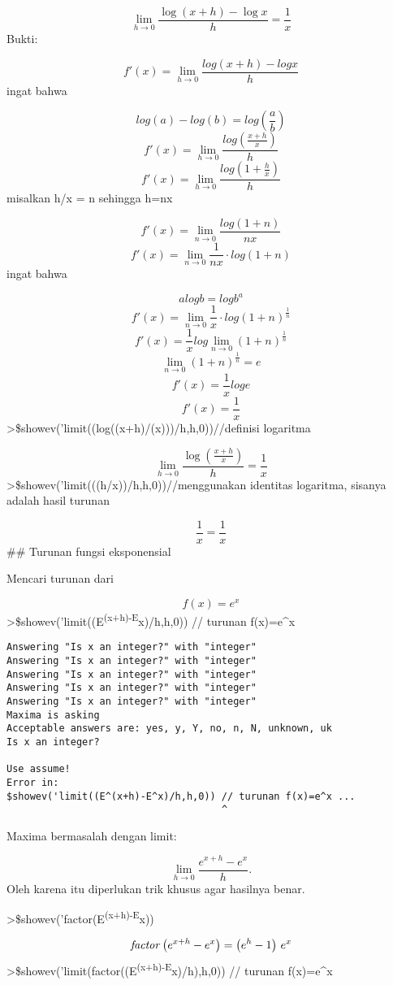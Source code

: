 \documentclass[
]{book}
\begin{document}
\[\lim_{h\rightarrow 0}{\frac{\log \left(x+h\right)-\log x}{h}}=  \frac{1}{x}\]Bukti:

\[f'(x) = \lim_{h\to 0} \frac{log(x+h)-log x}{h}\]ingat bahwa

\[log(a)-log(b)= log (\frac{a}{b})\]\[f'(x)=\lim_{h\to 0}\frac{log(\frac{x+h}{x})}{h}\]\[f'(x)=\lim_{h\to 0}\frac{log(1 + \frac{h}{x})}{h}\]misalkan h/x = n sehingga h=nx

\[f'(x)=\lim_{n\to 0}\frac{ log (1 + n)}{nx}\]\[f'(x)=\lim_{n\to 0}\frac{1}{nx} \cdot log(1+n)\]ingat bahwa

\[a log b = log b^a\]\[f'(x)=\lim_{n\to 0} \frac{1}{x} \cdot log(1+n)^\frac{1}{n}\]\[f'(x)= \frac{1}{x}log \lim_{n\to 0}(1+n)^\frac{1}{n}\]\[\lim_{n\to 0}(1+n)^\frac{1}{n} = e\]\[f'(x)= \frac{1}{x}log e\]\[f'(x)=\frac{1}{x}\]\textgreater\$showev('limit((log((x+h)/(x)))/h,h,0))//definisi logaritma

\[\lim_{h\rightarrow 0}{\frac{\log \left(\frac{x+h}{x}\right)}{h}}=  \frac{1}{x}\]\textgreater\$showev('limit(((h/x))/h,h,0))//menggunakan identitas logaritma, sisanya adalah hasil turunan

\[\frac{1}{x}=\frac{1}{x}\]\#\# Turunan fungsi eksponensial

Mencari turunan dari

\[f(x)=e^x\]\textgreater\$showev('limit((E\textsuperscript{(x+h)-E}x)/h,h,0)) // turunan f(x)=e\^{}x

\begin{verbatim}
Answering "Is x an integer?" with "integer"
Answering "Is x an integer?" with "integer"
Answering "Is x an integer?" with "integer"
Answering "Is x an integer?" with "integer"
Answering "Is x an integer?" with "integer"
Maxima is asking
Acceptable answers are: yes, y, Y, no, n, N, unknown, uk
Is x an integer?

Use assume!
Error in:
$showev('limit((E^(x+h)-E^x)/h,h,0)) // turunan f(x)=e^x ...
                                     ^
\end{verbatim}

Maxima bermasalah dengan limit:

\[\lim_{h\to 0}\frac{e^{x+h}-e^x}{h}.\]Oleh karena itu diperlukan trik khusus agar hasilnya benar.

\textgreater\$showev('factor(E\textsuperscript{(x+h)-E}x))

\[{\it factor}\left(e^{x+h}-e^{x}\right)=\left(e^{h}-1\right)\,e^{x}\]\textgreater\$showev('limit(factor((E\textsuperscript{(x+h)-E}x)/h),h,0)) // turunan f(x)=e\^{}x
\end{document}
